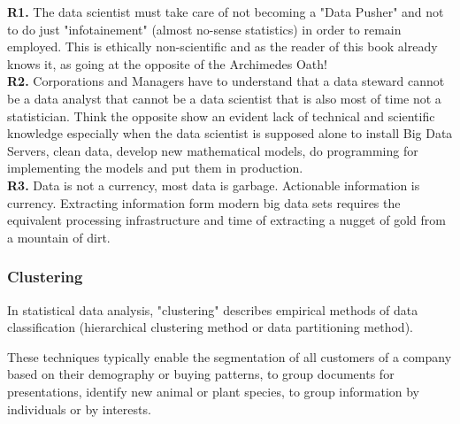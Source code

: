	\begin{tcolorbox}[title=Remarks,colframe=black,arc=10pt]
	\textbf{R1.} The data scientist must take care of not becoming a "Data Pusher" and not to do just "infotainement" (almost no-sense statistics) in order to remain employed. This is ethically non-scientific and as the reader of this book already knows it, as going at the opposite of the Archimedes Oath!\\
	
	\textbf{R2.} Corporations and Managers have to understand that a data steward cannot be a data analyst that cannot be a data scientist that is also most of time not a statistician. Think the opposite show an evident lack of technical and scientific knowledge especially when the data scientist is supposed alone to install Big Data Servers, clean data, develop new mathematical models, do programming for implementing the models and put them in production.\\
	
	\textbf{R3.} Data is not a currency, most data is garbage. Actionable information is currency. Extracting information form modern big data sets requires the equivalent processing infrastructure and time of extracting a nugget of gold from a mountain of dirt.
	\end{tcolorbox}
	
	\subsubsection{Clustering}
	In statistical data analysis, "clustering" describes empirical methods of data classification (hierarchical clustering method or data partitioning method).

	These techniques typically enable the segmentation of all customers of a company based on their demography or buying patterns, to group documents for presentations, identify new animal or plant species, to group information by individuals or by interests.

